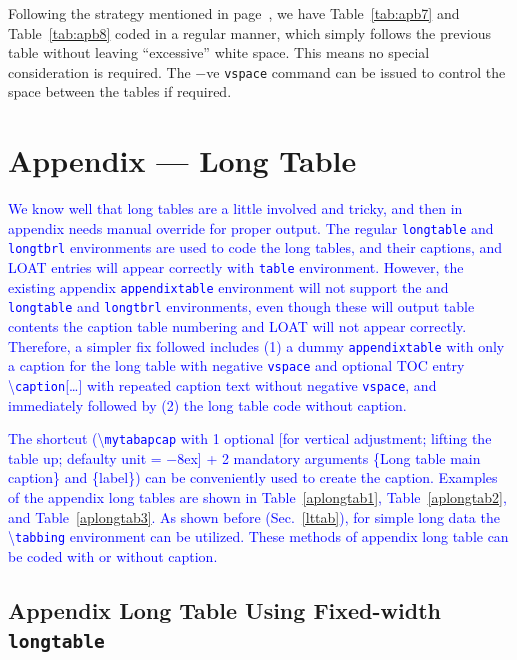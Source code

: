 \documentclass[phd]{ndsu-thesis-2022}
\newcommand\italk[1]{\textcolor{blue}{#1}}  %
\newcommand\cmd[1]{\textbackslash\texttt{#1}}  %
\newcommand\vb[1]{\textcolor{blue}{\texttt{#1}}}%
\begin{document}
{\color{blue} Following the strategy mentioned in page~\pageref{ttab}, we have Table~\ref{tab:apb7} and Table~\ref{tab:apb8} coded in a regular manner, which simply follows the previous table without leaving ``excessive'' white space. This means no special consideration is required. The $-$ve \texttt{vspace} command can be issued to control the space between the tables if required. 
} 
 

\section{Appendix --- Long Table}

\italk{We know well that long tables are a little involved and tricky, and then in appendix needs manual override for proper output. The regular \vb{longtable} and \vb{longtbrl} environments are used to code the long tables, and their captions, and LOAT entries will appear correctly with \vb{table} environment. However, the existing appendix \vb{appendixtable} environment will not support the and \vb{longtable} and \vb{longtbrl} environments, even though these will output table contents the caption table numbering and LOAT will not appear correctly. Therefore, a simpler fix followed includes (1) a dummy \vb{appendixtable} with only a caption for the long table with negative \vb{vspace} and optional TOC entry \cmd{caption}[\ldots] with repeated caption text without negative \vb{vspace}, and immediately followed by (2) the long table code without caption.} 

\italk{The shortcut (\cmd{mytabapcap} with 1 optional [for vertical adjustment; lifting the table up; defaulty unit = $-8$ex] + 2 mandatory arguments \{Long table main caption\} and \{label\}) can be conveniently used to create the caption. Examples of the appendix long tables are shown in Table~\ref{aplongtab1}, Table~\ref{aplongtab2}, and Table~\ref{aplongtab3}. As shown before (Sec.~\ref{lttab}), for simple long data the \cmd{tabbing} environment can be utilized. These methods of appendix long table can be coded with or without caption.}  


\subsection{Appendix Long Table Using Fixed-width \texttt{longtable}}

\end{document}
